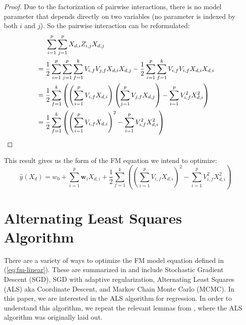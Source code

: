 \documentclass[10pt]{journal}
\newtheorem{proof}{Proof}
\begin{document}
\begin{proof}
    Due to the factorization of pairwise interactions, there is no model
    parameter that depends directly on two variables (no parameter is indexed by
    both $i$ and $j$). So the pairwise interaction can be reformulated:
    \begin{align}
        & \hphantom{==  } \begin{aligned}[t]
            \sum_{i=1}^p \sum_{j=1}^p X_{d,i} Z_{i,j} X_{d,j}  \\
        \end{aligned} \\
        &= \begin{aligned}[t]
            \frac{1}{2}\sum_{i=1}^p \sum_{j=1}^p \sum_{f=1}^k
                V_{i,f} V_{j,f} X_{d,i} X_{d,j} -
            \frac{1}{2}\sum_{i=1}^p \sum_{f=1}^k V_{i,f} V_{i,f} X_{d,i} X_{d,i}
        \end{aligned} \\
        &= \begin{aligned}[t]
            \frac{1}{2} \sum_{f=1}^k \left(
                \left(\sum_{i=1}^p V_{i,f} X_{d,i}\right)
                \left(\sum_{j=1}^p V_{j,f} X_{d,j}\right) -
                \sum_{i=1}^p V_{i,f}^2 X_{d,i}^2
            \right)
        \end{aligned} \\
        &= \begin{aligned}[t]
            \frac{1}{2} \sum_{f=1}^k \left(
                \left(\sum_{i=1}^p V_{i,f} X_{d,i}\right)^2 -
                \sum_{i=1}^p V_{i,f}^2 X_{d,i}^2
            \right)
        \end{aligned}
    \end{align}
\end{proof}
%
This result gives us the form of the FM equation we intend to optimize:
%
\begin{equation} \label{eq:fm-linear}
    \hat{y}(X_d) = w_0 + \sum_{i=1}^p \bm{w}_i X_{d,i} +
        \frac{1}{2} \sum_{f=1}^k \left(
            \left(\sum_{i=1}^p V_{i,f} X_{d,i}\right)^2 -
            \sum_{i=1}^p V_{i,f}^2 X_{d,i}^2
        \right)
\end{equation}


\section{Alternating Least Squares Algorithm}

There are a variety of ways to optimize the FM model equation defined in
(\ref{eq:fm-linear}). These are summarized in \cite{rendle_factorization_2012}
and include Stochastic Gradient Descent (SGD), SGD with adaptive regularization,
Alternating Least Squares (ALS) aka Coordinate Descent, and Markov Chain Monte
Carlo (MCMC). In this paper, we are interested in the ALS algorithm for
regression. In order to understand this algorithm, we repeat the relevant lemmas
from \cite{rendle_fast_2011}, where the ALS algorithm was originally laid out.
\end{document}
